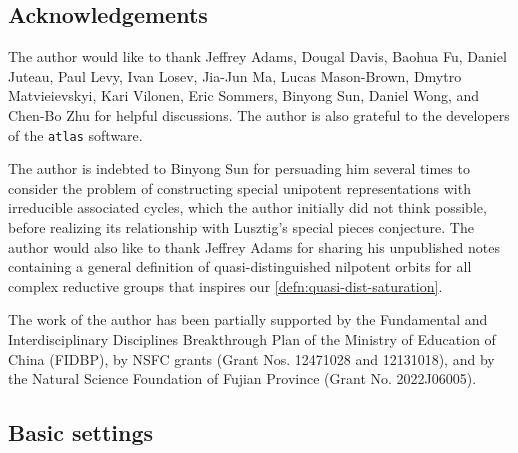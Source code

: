 \documentclass[11pt, a4paper]{amsart}
\makeatletter
\let\origsection\section
\renewcommand\section{\@ifstar{\starsection}{\nostarsection}}
\newcommand\nostarsection[1]
{\sectionprelude\origsection{#1}\sectionpostlude}
\newcommand\starsection[1]
{\sectionprelude\origsection*{#1}\sectionpostlude}
\newcommand\sectionprelude{%
  \vspace{1em}
}
\newcommand\sectionpostlude{%
  \vspace{1em}
}
\newcommand{\g}{\mathfrak{g}}
\newcommand{\orb}{\mathbb{O}}
\newcommand{\orbk}{\orb_{K}}
\newcommand{\fk}{\mathfrak{k}}
\newcommand{\ckorb}{\check{\orb}}
\DeclareMathOperator{\AOD}{AOD}
\DeclareMathOperator{\Unip}{Unip}
\newcommand{\AODK}{\AOD_K}
\newcommand{\UnipOv}{\Unip_{\ckorb}}
\newcommand{\quan}{\mathcal{Q}}
\theoremstyle{definition}
\numberwithin{equation}{section}
\makeatother
\begin{document}

\subsection{Acknowledgements}
The author would like to thank Jeffrey Adams, Dougal Davis, Baohua Fu, Daniel Juteau, Paul Levy, Ivan Losev, Jia-Jun Ma, Lucas Mason-Brown, Dmytro Matvieievskyi, Kari Vilonen, Eric Sommers, Binyong Sun, Daniel Wong, and Chen-Bo Zhu for helpful discussions. The author is also grateful to the developers of the \texttt{atlas} software.

The author is indebted to Binyong Sun for persuading him several times to consider the problem of constructing special unipotent representations with irreducible associated cycles, which the author initially did not think possible, before realizing its relationship with Lusztig's special pieces conjecture. The author would also like to thank Jeffrey Adams for sharing his unpublished notes \cite{Adams:quasi-dist} containing a general definition of quasi-distinguished nilpotent orbits for all complex reductive groups that inspires our \cref{defn:quasi-dist-saturation}.

The work of the author has been partially supported by the Fundamental and Interdisciplinary Disciplines Breakthrough Plan of the Ministry of Education of China (FIDBP), by NSFC grants (Grant Nos. 12471028 and 12131018), and by the Natural Science Foundation of Fujian Province (Grant No. 2022J06005).


\section{Preliminaries}
\label{sec:preliminaries}

\subsection{Basic settings} \label{subsec:basic_settings}
\end{document}
